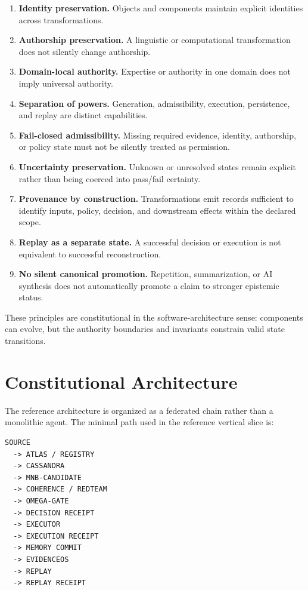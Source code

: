 \documentclass[11pt]{article}
\begin{document}
\begin{enumerate}
  \item \textbf{Identity preservation.} Objects and components maintain explicit identities across transformations.
  \item \textbf{Authorship preservation.} A linguistic or computational transformation does not silently change authorship.
  \item \textbf{Domain-local authority.} Expertise or authority in one domain does not imply universal authority.
  \item \textbf{Separation of powers.} Generation, admissibility, execution, persistence, and replay are distinct capabilities.
  \item \textbf{Fail-closed admissibility.} Missing required evidence, identity, authorship, or policy state must not be silently treated as permission.
  \item \textbf{Uncertainty preservation.} Unknown or unresolved states remain explicit rather than being coerced into pass/fail certainty.
  \item \textbf{Provenance by construction.} Transformations emit records sufficient to identify inputs, policy, decision, and downstream effects within the declared scope.
  \item \textbf{Replay as a separate state.} A successful decision or execution is not equivalent to successful reconstruction.
  \item \textbf{No silent canonical promotion.} Repetition, summarization, or AI synthesis does not automatically promote a claim to stronger epistemic status.
\end{enumerate}

These principles are constitutional in the software-architecture sense: components can evolve, but the authority boundaries and invariants constrain valid state transitions.

\section{Constitutional Architecture}

The reference architecture is organized as a federated chain rather than a monolithic agent. The minimal path used in the reference vertical slice is:

\begin{verbatim}
SOURCE
  -> ATLAS / REGISTRY
  -> CASSANDRA
  -> MNB-CANDIDATE
  -> COHERENCE / REDTEAM
  -> OMEGA-GATE
  -> DECISION RECEIPT
  -> EXECUTOR
  -> EXECUTION RECEIPT
  -> MEMORY COMMIT
  -> EVIDENCEOS
  -> REPLAY
  -> REPLAY RECEIPT
\end{verbatim}
\end{document}
